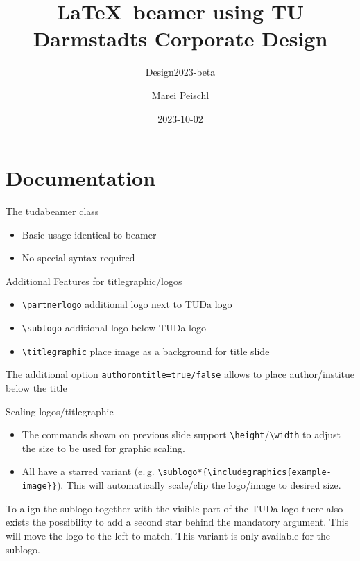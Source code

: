 \documentclass[
	english,%
	design=2023,%
]{tudabeamer}
\title[TUDaBeamer2023]{\LaTeX~beamer using TU Darmstadts Corporate Design}
\subtitle{Design2023-beta}
\author[M. Peischl]{Marei Peischl}
\institute{pei\TeX}
\date{2023-10-02}
\newcommand*{\code}[1]{\texttt{#1}}
\begin{document}
\maketitle

\tableofcontents

\section{Documentation}
\sectionpage

\begin{frame}{The tudabeamer class}
\begin{itemize}
	\item Basic usage identical to beamer
	\item No special syntax required
\end{itemize}
\end{frame}

\begin{frame}{Additional Features for titlegraphic/logos}
\begin{itemize}
	\item \code{\textbackslash{}partnerlogo} additional logo next to TUDa logo
	\item \code{\textbackslash{}sublogo} additional logo below TUDa logo
	\item \code{\textbackslash{}titlegraphic} place image as a background for title slide
\end{itemize}
The additional option \code{authorontitle=true/false} allows to place author/institue below the title
\end{frame}

\begin{frame}{Scaling logos/titlegraphic}
\begin{itemize}
	\item The commands shown on previous slide support \code{\textbackslash{}height}/\code{\textbackslash{}width} to adjust the size to be used for graphic scaling.
	\item All have a starred variant (e.\,g. \code{\textbackslash{}sublogo*\{\textbackslash{}includegraphics\{example-image\}\}}).
	      This will automatically scale/clip the logo/image to desired size.
\end{itemize}

To align the sublogo together with the visible part of the TUDa logo there also exists the possibility to add a second star behind the mandatory argument. This will move the logo to the left to match. This variant is only available for the sublogo.
\end{frame}
\end{document}
